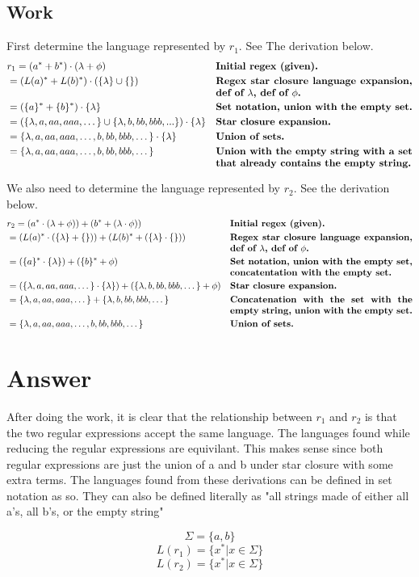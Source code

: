 \documentclass{assignment-x}
\begin{document}
\subsection{Work}
First determine the language represented by $r_1$. See The derivation below.
\begin{align*}
    \proofline{r_1 = (a^* + b^*) \cdot (\lambda + \phi)}{Initial regex (given).}
    \proofline{= (L(a)^* + L(b)^*) \cdot (\{\lambda\} \cup \{\})}{Regex star closure language expansion, def of $\lambda$, def of $\phi$.}
    \proofline{= (\{a\}^*+\{b\}^*) \cdot \{\lambda\}}{Set notation, union with the empty set.}
    \proofline{= (\{\lambda, a,aa,aaa,\dots\} \cup \{\lambda,b,bb,bbb,...\}) \cdot \{\lambda\}}{Star closure expansion.}
    \proofline{= \{\lambda,a,aa,aaa,\dots,b,bb,bbb,\dots\} \cdot \{\lambda\}}{Union of sets.}
    \proofline{= \{\lambda,a,aa,aaa,\dots,b,bb,bbb,\dots\} }{Union with the empty string with a set that already contains the empty string.}
\end{align*}

We also need to determine the language represented by $r_2$. See the derivation below.
\begin{align*}
    \proofline{r_2=(a^* \cdot (\lambda + \phi)) + (b^*+(\lambda \cdot \phi))}{Initial regex (given).}
    \proofline{= (L(a)^* \cdot (\{\lambda\}+ \{\})) + (L(b)^*+(\{\lambda\} \cdot \{\}))}{Regex star closure language expansion, def of $\lambda$, def of $\phi$.}
    \proofline{= (\{a\}^*\cdot\{\lambda\})+(\{b\}^*+ \phi)}{Set notation, union with the empty set, concatentation with the empty set.}
    \proofline{= (\{\lambda,a,aa,aaa,\dots\} \cdot \{\lambda\}) + (\{\lambda,b,bb,bbb,\dots\} + \phi)}{Star closure expansion.}
    \proofline{= \{\lambda,a,aa,aaa,\dots\} + \{\lambda,b,bb,bbb,\dots\}}{Concatenation with the set with the empty string, union with the empty set.}
    \proofline{= \{\lambda,a,aa,aaa,\dots,b,bb,bbb,\dots\}}{Union of sets.}
\end{align*}

\section{Answer}
After doing the work, it is clear that the relationship between $r_1$ and $r_2$ is that the two regular expressions accept the same language. The languages found while reducing the regular expressions are equivilant. This makes sense since both regular expressions are just the union of a and b under star closure with some extra terms. The languages found from these derivations can be defined in set notation as so. They can also be defined literally as "all strings made of either all a's, all b's, or the empty string"

$$\Sigma=\{a,b\}$$
$$L(r_1) = \{x^* | x \in \Sigma \}$$
$$L(r_2) = \{x^* | x \in \Sigma \}$$
\end{document}
